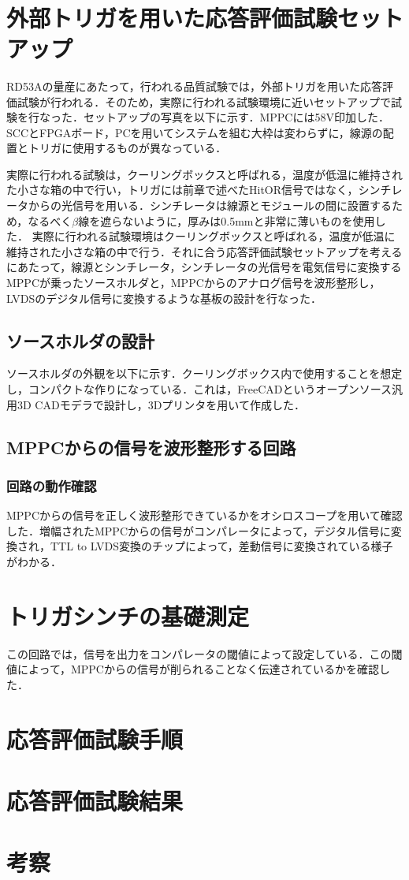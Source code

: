 \



\section{外部トリガを用いた応答評価試験セットアップ}
\label{sec:extsetup}
RD53Aの量産にあたって，行われる品質試験では，外部トリガを用いた応答評価試験が行われる．そのため，実際に行われる試験環境に近いセットアップで試験を行なった．セットアップの写真を以下に示す．MPPCには58$\mathrm{V}$印加した．SCCとFPGAボード，PCを用いてシステムを組む大枠は変わらずに，線源の配置とトリガに使用するものが異なっている．\par
実際に行われる試験は，クーリングボックスと呼ばれる，温度が低温に維持された小さな箱の中で行い，トリガには前章で述べたHitOR信号ではなく，シンチレータからの光信号を用いる．シンチレータは線源とモジュールの間に設置するため，なるべく$\beta$線を遮らないように，厚みは0.5$\mathrm{mm}$と非常に薄いものを使用した．
実際に行われる試験環境はクーリングボックスと呼ばれる，温度が低温に維持された小さな箱の中で行う．それに合う応答評価試験セットアップを考えるにあたって，線源とシンチレータ，シンチレータの光信号を電気信号に変換するMPPCが乗ったソースホルダと，MPPCからのアナログ信号を波形整形し，LVDSのデジタル信号に変換するような基板の設計を行なった．

\subsection{ソースホルダの設計}
ソースホルダの外観を以下に示す．クーリングボックス内で使用することを想定し，コンパクトな作りになっている．これは，FreeCADというオープンソース汎用3D CADモデラで設計し，3Dプリンタを用いて作成した．

\subsection{MPPCからの信号を波形整形する回路}

\subsubsection*{回路の動作確認}
MPPCからの信号を正しく波形整形できているかをオシロスコープを用いて確認した．増幅されたMPPCからの信号がコンパレータによって，デジタル信号に変換され，TTL to LVDS変換のチップによって，差動信号に変換されている様子がわかる．

\section{トリガシンチの基礎測定}
この回路では，信号を出力をコンパレータの閾値によって設定している．この閾値によって，MPPCからの信号が削られることなく伝達されているかを確認した．

\section{応答評価試験手順}
\label{sec:exthow}
\section{応答評価試験結果}
\label{sec:extconc}
\section{考察}
\label{sec:extsum}
